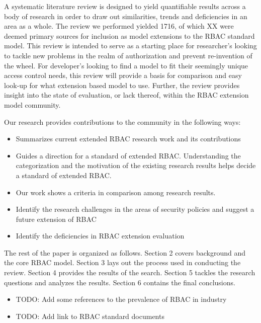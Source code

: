 A systematic literature review is designed to yield quantifiable results across a body of research in order to draw out similarities, trends and deficiencies in an area as a whole.  The review we performed yielded 1716, of which XX were deemed primary sources for inclusion as model extensions to the RBAC standard model.  This review is intended to serve as a starting place for researcher's looking to tackle new problems in the realm of authorization and prevent re-invention of the wheel. For developer's looking to find a model to fit their seemingly unique access control needs, this review will provide a basis for comparison and easy look-up for what extension based model to use.  Further, the review provides insight into the state of evaluation, or lack thereof, within the RBAC extension model community.

Our research provides contributions to the community in the following ways:

\begin{itemize}
\item Summarizes current extended RBAC research work and its contributions
\item Guides a direction for a standard of extended RBAC. Understanding the categorization and the motivation of the existing research results helps decide a standard of extended RBAC.
\item Our work shows a criteria in comparison among research results.
\item Identify the research challenges in the areas of security policies and suggest a future extension of RBAC
\item Identify the deficiencies in RBAC extension evaluation
\end{itemize}

The rest of the paper is organized as follows.  Section 2 covers background and the core RBAC model. Section 3 lays out the process used in conducting the review. Section 4 provides the results of the search. Section 5 tackles the research questions and analyzes the results.  Section 6 contains the final conclusions.

\begin{itemize}
\item TODO: Add some references to the prevalence of RBAC in industry
\item TODO: Add link to RBAC standard documents
\end{itemize}
